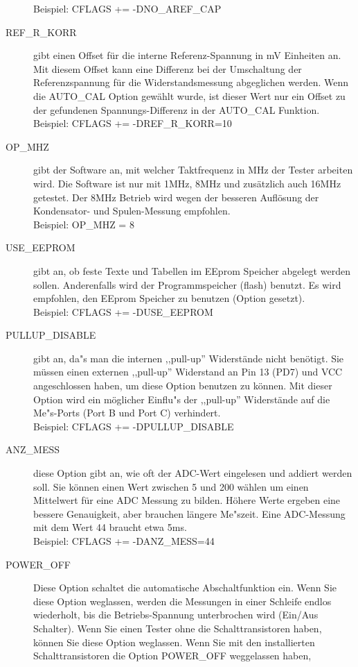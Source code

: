 \begin{description}
Beispiel: CFLAGS += -DNO\_AREF\_CAP
  \item[REF\_R\_KORR] gibt einen Offset f\"ur die interne Referenz-Spannung in mV Einheiten an.
Mit diesem Offset kann eine Differenz bei der Umschaltung der Referenzspannung f\"ur die Widerstandsmessung abgeglichen werden.
Wenn die AUTO\_CAL Option gew\"ahlt wurde, ist dieser Wert nur ein Offset zu der gefundenen Spannungs-Differenz in der
AUTO\_CAL Funktion.\\
Beispiel:  CFLAGS += -DREF\_R\_KORR=10
  \item[OP\_MHZ] gibt der Software an, mit welcher Taktfrequenz in MHz der Tester arbeiten wird.
Die Software ist nur mit 1MHz, 8MHz und zus\"atzlich auch 16MHz getestet. Der 8MHz Betrieb wird wegen der besseren Aufl\"osung der
Kondensator- und Spulen-Messung empfohlen.\\
Beispiel: OP\_MHZ = 8
  \item[USE\_EEPROM] gibt an, ob feste Texte und Tabellen im EEprom Speicher abgelegt werden sollen.
Anderenfalls wird der Programmspeicher (flash) benutzt.
Es wird empfohlen, den EEprom Speicher zu benutzen (Option gesetzt).\\
Beispiel: CFLAGS += -DUSE\_EEPROM
  \item[PULLUP\_DISABLE] gibt an, da"s man die internen ,,pull-up'' Widerst\"ande nicht ben\"otigt.
 Sie m\"ussen einen externen ,,pull-up'' Widerstand an Pin 13 (PD7) und VCC angeschlossen haben, um diese
Option benutzen zu k\"onnen.
Mit dieser Option wird ein m\"oglicher Einflu"s der ,,pull-up'' Widerst\"ande auf die Me"s-Ports (Port B und Port C) verhindert.\\
Beispiel: CFLAGS += -DPULLUP\_DISABLE
  \item[ANZ\_MESS] diese Option gibt an, wie oft der ADC-Wert eingelesen und addiert werden soll.
Sie k\"onnen einen Wert zwischen 5 und 200 w\"ahlen um einen Mittelwert f\"ur eine ADC Messung zu bilden.
H\"ohere Werte ergeben eine bessere Genauigkeit, aber brauchen l\"angere Me"szeit.
Eine ADC-Messung mit dem Wert 44 braucht etwa 5ms.\\
Beispiel: CFLAGS += -DANZ\_MESS=44
  \item[POWER\_OFF] Diese Option schaltet die automatische Abschaltfunktion ein.
Wenn Sie diese Option weglassen, werden die Messungen in einer Schleife endlos wiederholt, bis die Betriebs-Spannung 
unterbrochen wird (Ein/Aus Schalter).
Wenn Sie einen Tester ohne die Schalttransistoren haben, k\"onnen Sie diese Option weglassen.
Wenn Sie mit den installierten Schalttransistoren die Option POWER\_OFF weggelassen haben,

\end{description}
